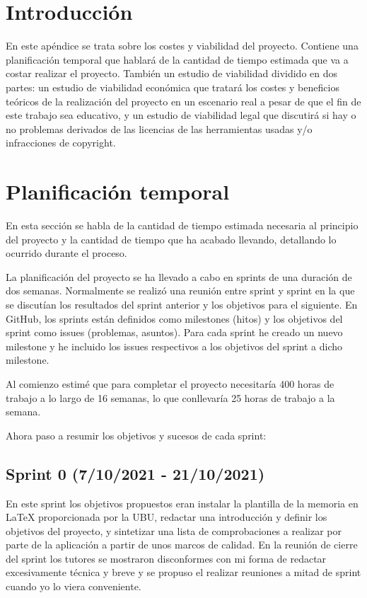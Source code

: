 
\section{Introducción}
En este apéndice se trata sobre los costes y viabilidad del proyecto. Contiene una planificación temporal que hablará de la cantidad de tiempo estimada que va a costar realizar el proyecto. También un estudio de viabilidad dividido en dos partes: un estudio de viabilidad económica que tratará los costes y beneficios teóricos de la realización del proyecto en un escenario real a pesar de que el fin de este trabajo sea educativo, y un estudio de viabilidad legal que discutirá si hay o no problemas derivados de las licencias de las herramientas usadas y/o infracciones de copyright.
\section{Planificación temporal}
En esta sección se habla de la cantidad de tiempo estimada necesaria al principio del proyecto y la cantidad de tiempo que ha acabado llevando, detallando lo ocurrido durante el proceso.

La planificación del proyecto se ha llevado a cabo en sprints de una duración de dos semanas. Normalmente se realizó una reunión entre sprint y sprint en la que se discutían los resultados del sprint anterior y los objetivos para el siguiente. En GitHub, los sprints están definidos como milestones (hitos) y los objetivos del sprint como issues (problemas, asuntos). Para cada sprint he creado un nuevo milestone y he incluido los issues respectivos a los objetivos del sprint a dicho milestone.

Al comienzo estimé que para completar el proyecto necesitaría 400 horas de trabajo a lo largo de 16 semanas, lo que conllevaría 25 horas de trabajo a la semana.

Ahora paso a resumir los objetivos y sucesos de cada sprint:

\subsection{Sprint 0 (7/10/2021 - 21/10/2021)}
	En este sprint los objetivos propuestos eran instalar la plantilla de la memoria en LaTeX proporcionada por la UBU, redactar una introducción y definir los objetivos del proyecto, y sintetizar una lista de comprobaciones a realizar por parte de la aplicación a partir de unos marcos de calidad. En la reunión de cierre del sprint los tutores se mostraron disconformes con mi forma de redactar excesivamente técnica y breve y se propuso el realizar reuniones a mitad de sprint cuando yo lo viera conveniente.
